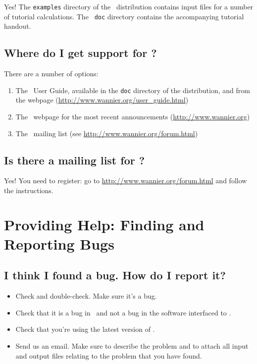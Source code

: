 Yes! The {\tt examples} directory of the \wannier\ distribution
contains input files for a number of tutorial calculations. The {\tt
  doc} directory contains the accompanying tutorial handout.

\subsection{Where do I get support for \wannier?}

There are a number of options:

\begin{enumerate}
\item The \wannier\ User Guide, available in the {\tt doc} directory of the
  distribution, and from the webpage (\url{http://www.wannier.org/user\_guide.html})
\item The \wannier\ webpage for the most recent announcements (\url{http://www.wannier.org})
\item The \wannier\ mailing list (see \url{http://www.wannier.org/forum.html})
\end{enumerate}

\subsection{Is there a mailing list for \wannier?}

Yes! You need to register: go to \url{http://www.wannier.org/forum.html} and
follow the instructions.

\section{Providing Help: Finding and Reporting Bugs}

\subsection{I think I found a bug. How do I report it?}

\begin{itemize}
\item Check and double-check. Make sure it's a bug.
\item Check that it is a bug in \wannier\ and not a bug in the
  software interfaced to \wannier.
\item Check that you're using the latest version of \wannier.
\item Send us an email. Make sure to
  describe the problem and to attach all input and output files
  relating to the problem that you have found.
\end{itemize}

